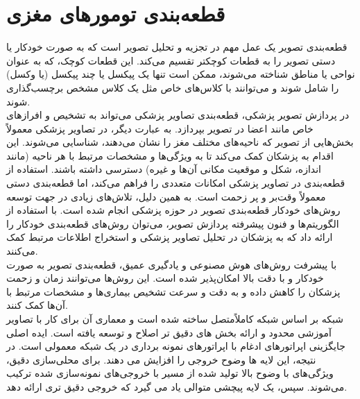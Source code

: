 \section{قطعه‌بندی تومورهای مغزی}
قطعه‌بندی تصویر یک عمل مهم در تجزیه و تحلیل تصویر است که به صورت خودکار یا دستی تصویر را به قطعات کوچکتر تقسیم می‌کند. این قطعات کوچک، که به عنوان نواحی یا مناطق شناخته می‌شوند، ممکن است تنها یک پیکسل یا چند پیکسل (یا وکسل) را شامل شوند و می‌توانند با کلاس‌های خاص مثل یک کلاس مشخص برچسب‌گذاری شوند.
\\
در پردازش تصویر پزشکی، قطعه‌بندی تصاویر پزشکی می‌تواند به تشخیص و افرازهای خاص مانند اعضا در تصویر بپردازد. به عبارت دیگر، در تصاویر پزشکی معمولاً بخش‌هایی از تصویر که ناحیه‌های مختلف مغز را نشان می‌دهند، شناسایی می‌شوند. این اقدام به پزشکان کمک می‌کند تا به ویژگی‌ها و مشخصات مرتبط با هر ناحیه (مانند اندازه، شکل و موقعیت مکانی آن‌ها و غیره) دسترسی داشته باشند. استفاده از قطعه‌بندی در تصاویر پزشکی امکانات متعددی را فراهم می‌کند، اما قطعه‌بندی دستی معمولاً وقت‌بر و پر زحمت است. به همین دلیل، تلاش‌های زیادی در جهت توسعه روش‌های خودکار قطعه‌بندی تصویر در حوزه پزشکی انجام شده است. با استفاده از الگوریتم‌ها و فنون پیشرفته پردازش تصویر، می‌توان روش‌های قطعه‌بندی خودکار را ارائه داد که به پزشکان در تحلیل تصاویر پزشکی و استخراج اطلاعات مرتبط کمک می‌کنند.
\\
با پیشرفت روش‌های هوش مصنوعی و یادگیری عمیق، قطعه‌بندی تصویر به صورت خودکار و با دقت بالا امکان‌پذیر شده است. این روش‌ها می‌توانند زمان و زحمت پزشکان را کاهش داده و به دقت و سرعت تشخیص بیماری‌ها و مشخصات مرتبط با آن‌ها کمک کنند\cite{xu2022medical}.
\\
شبکه  بر اساس شبکه کاملاًمتصل ساخته شده است و معماری آن برای کار با تصاویر آموزشی محدود و ارائه بخش های دقیق تر اصلاح و توسعه یافته است. ایده اصلی  جایگزینی اپراتورهای ادغام با اپراتورهای نمونه برداری در یک شبکه معمولی است. در نتیجه، این لایه ها وضوح خروجی را افزایش می دهند. برای محلی‌سازی دقیق، ویژگی‌های با وضوح بالا تولید شده از مسیر  با خروجی‌های نمونه‌سازی شده ترکیب می‌شوند. سپس، یک لایه پیچشی متوالی یاد می گیرد که خروجی دقیق تری ارائه دهد.

